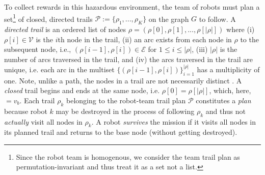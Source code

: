 \documentclass[fleqn,10pt,lineno]{wlpeerj}
\begin{document}
To collect rewards in this hazardous environment, the team of robots must plan a set\footnote{Since the robot team is homogenous, we consider the team trail plan as permutation-invariant and thus treat it as a set not a list.} of closed, directed trails $\mathcal{P}:=\{\rho_1, ..., \rho_K\}$ on the graph $G$ to follow.
A \emph{directed trail} \cite{clark1991first,graphtheory2} is an ordered list of nodes $\rho = (\rho[0], \rho[1], ..., \rho[\lvert \rho \rvert])$ where
(i) $\rho[i] \in \mathcal{V}$ is the $i$th node in the trail,  
(ii) an arc exists from each node in $\rho$ to the subsequent node, i.e., $(\rho[i-1], \rho[i])\in\mathcal{E}$ for $1 \leq i  \leq \lvert \rho \rvert$,
(iii) $\lvert \rho \rvert$ is the number of arcs traversed in the trail,
and
(iv) the arcs traversed in the trail are unique, i.e. each arc in the multiset $\{(\rho[i-1], \rho[i])\}_{i=1}^{\lvert \rho \rvert}$ has a multiplicity of one.
Note, unlike a path, the nodes in a trail are not necessarily distinct \cite{wilson1979introduction}.
A \emph{closed} trail begins and ends at the same node, i.e. $\rho [0]=\rho[\lvert \rho \rvert]$, which, here, $=v_b$.
Each trail $\rho_k$ belonging to the robot-team trail plan $\mathcal{P}$ constitutes a \emph{plan} because robot $k$ may be destroyed in the process of following $\rho_k$ and thus not \emph{actually} visit all nodes in $\rho_k$. A robot \emph{survives} the mission if it visits all nodes in its planned trail and returns to the base node (without getting destroyed).
\end{document}

